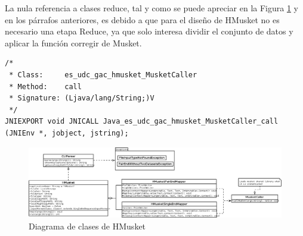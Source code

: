 \documentclass[conference]{IEEEtran}
\begin{document}
La nula referencia a clases reduce, tal y como se puede apreciar en la Figura \ref{class_diagram} y en los párrafos anteriores, es debido a que para el diseño de HMusket no es necesario una etapa Reduce, ya que solo interesa dividir el conjunto de datos y aplicar la función corregir de Musket.

\begin{lstlisting}[style=CStyle, caption=Cabecera JNI generada, label=jni_header]
/*
 * Class:     es_udc_gac_hmusket_MusketCaller
 * Method:    call
 * Signature: (Ljava/lang/String;)V
 */
JNIEXPORT void JNICALL Java_es_udc_gac_hmusket_MusketCaller_call (JNIEnv *, jobject, jstring);
\end{lstlisting}

\begin{figure}
	\includegraphics[width=\textwidth]{figures/hmusket.png}
	\caption{Diagrama de clases de HMusket}
	\label{class_diagram}
\end{figure}
\end{document}
